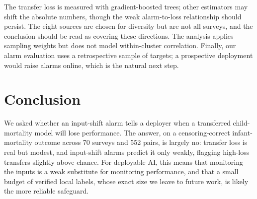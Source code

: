 \documentclass[letterpaper]{article} %
\begin{document}
The transfer loss is measured with gradient-boosted trees; other estimators may shift the absolute numbers, though the weak alarm-to-loss relationship should persist. The eight sources are chosen for diversity but are not all surveys, and the conclusion should be read as covering these directions. The analysis applies sampling weights but does not model within-cluster correlation. Finally, our alarm evaluation uses a retrospective sample of targets; a prospective deployment would raise alarms online, which is the natural next step.

\section{Conclusion}

We asked whether an input-shift alarm tells a deployer when a transferred child-mortality model will lose performance. The answer, on a censoring-correct infant-mortality outcome across 70 surveys and 552 pairs, is largely no: transfer loss is real but modest, and input-shift alarms predict it only weakly, flagging high-loss transfers slightly above chance. For deployable AI, this means that monitoring the inputs is a weak substitute for monitoring performance, and that a small budget of verified local labels, whose exact size we leave to future work, is likely the more reliable safeguard.


\end{document}
